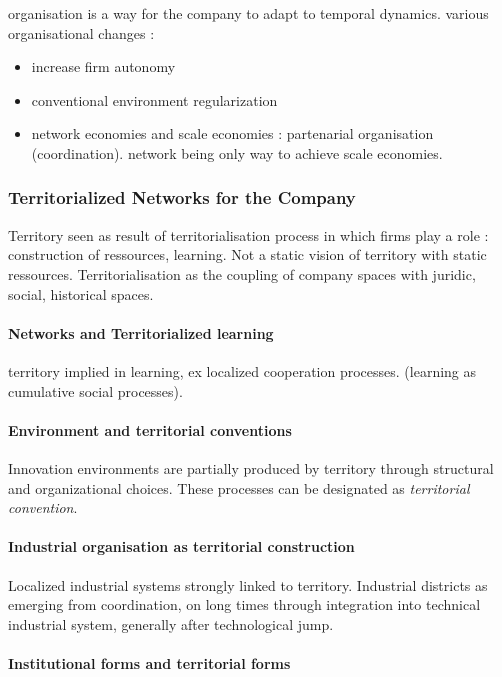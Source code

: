 organisation is a way for the company to adapt to temporal dynamics. various organisational changes :
\begin{itemize}
\item increase firm autonomy
\item conventional environment regularization
\item network economies and scale economies : partenarial organisation (coordination). network being only way to achieve scale economies.
\end{itemize}


\subsubsection*{Territorialized Networks for the Company}

Territory seen as result of territorialisation process in which firms play a role : construction of ressources, learning. Not a static vision of territory with static ressources. Territorialisation as the coupling of company spaces with juridic, social, historical spaces.

\paragraph{Networks and Territorialized learning}

territory implied in learning, ex localized cooperation processes. (learning as cumulative social processes).

\paragraph{Environment and territorial conventions}

Innovation environments are partially produced by territory through structural and organizational choices. These processes can be designated as \emph{territorial convention}.

\paragraph{Industrial organisation as territorial construction}

Localized industrial systems strongly linked to territory. Industrial districts as emerging from coordination, on long times through integration into technical industrial system, generally after technological jump.

\paragraph{Institutional forms and territorial forms}

